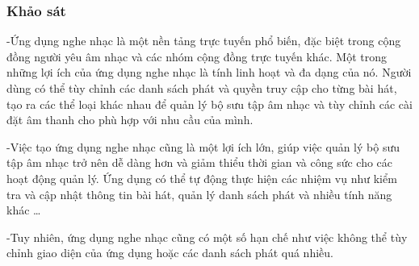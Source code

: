 \documentclass[a4paper]{article}
\begin{document}
\subsubsection{Khảo sát}
\begin{flushleft}
	-Ứng dụng nghe nhạc là một nền tảng trực tuyến phổ biến, đặc biệt trong cộng đồng người yêu âm nhạc và các nhóm cộng đồng trực tuyến khác.
	Một trong những lợi ích của ứng dụng nghe nhạc là tính linh hoạt và đa dạng của nó. Người dùng có thể tùy chỉnh các danh sách phát và quyền truy cập cho từng bài hát,
	tạo ra các thể loại khác nhau để quản lý bộ sưu tập âm nhạc và tùy chỉnh các cài đặt âm thanh cho phù hợp với nhu cầu của mình.

	-Việc tạo ứng dụng nghe nhạc cũng là một lợi ích lớn, giúp việc quản lý bộ sưu tập âm nhạc trở nên dễ dàng hơn và giảm thiểu
	thời gian và công sức cho các hoạt động quản lý. Ứng dụng có thể tự động thực hiện các nhiệm vụ như kiểm tra và cập nhật thông tin bài hát,
	quản lý danh sách phát và nhiều tính năng khác \dots

	-Tuy nhiên, ứng dụng nghe nhạc cũng có một số hạn chế như việc không thể tùy chỉnh giao diện của ứng dụng hoặc các danh sách phát quá nhiều.
\end{flushleft}
\end{document}

